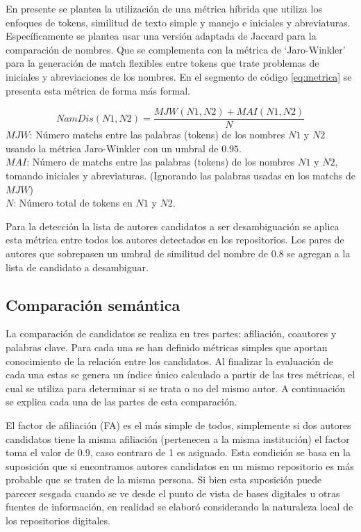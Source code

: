 \documentclass[conference]{IEEEtran}
\begin{document}
En presente se plantea la utilización de una métrica híbrida que utiliza los enfoques de tokens, similitud de texto simple y manejo e iniciales y abreviaturas. Específicamente se plantea usar una versión adaptada de Jaccard para la comparación de nombres. Que se complementa con la  métrica de ‘Jaro-Winkler’ para la generación de  match flexibles entre tokens que trate problemas de iniciales y abreviaciones de los nombres. En el segmento de código \ref{eq:metrica} se presenta esta métrica de forma más formal.

\begin{equation}\label{eq:metrica}
NamDis(N1, N2) = \frac{MJW(N1, N2)+ MAI(N1,N2)}{N}
\end{equation}
$MJW$: Número matchs entre las palabras (tokens) de los nombres $N1$ y $N2$ usando la métrica Jaro-Winkler con un umbral de $0.95$.\\
$MAI$: Número de matchs entre las palabras (tokens) de los nombres $N1$ y $N2$, tomando iniciales y abreviaturas. (Ignorando las palabras usadas en los matchs de $MJW$)\\
$N$: Número total de tokens en $N1$ y $N2$.

Para la detección la lista de autores candidatos a ser desambiguación se aplica esta métrica entre todos los autores detectados en los repositorios. Los pares de autores que sobrepasen un umbral de similitud del nombre de $0.8$  se agregan a la lista de candidato a desambiguar.

\subsection{Comparación semántica}
La comparación de candidatos se realiza en tres partes:  afiliación, coautores y palabras clave. Para cada una se han definido métricas simples  que aportan conocimiento de la relación entre los candidatos. Al finalizar la evaluación de cada una estas se genera un índice único calculado a partir de las tres métricas, el cual se utiliza para determinar si se trata o no del mismo autor.   A continuación se explica cada una de las partes de esta comparación.

El factor de afiliación (FA) es el más simple de todos, simplemente si dos autores candidatos tiene la misma afiliación (pertenecen a la misma institución) el factor toma el valor de 0.9, caso contraro de 1 es asignado. Esta condición se basa en la suposición que si encontramos autores candidatos en un mismo repositorio es más probable que se traten de la misma persona. Si bien esta suposición puede parecer sesgada cuando se ve desde el punto de vista de bases digitales u otras fuentes de información, en realidad se elaboró considerando la naturaleza local de los repositorios digitales.
 
\end{document}
